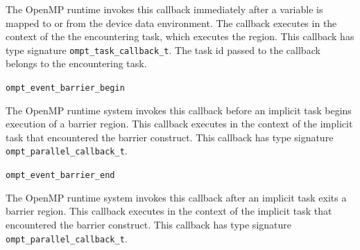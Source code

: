 \documentclass{article}
\newcommand{\descheader}[1]{{\needspace{3\baselineskip}\vspace{1em}\noindent \fbox{#1}}}
\begin{document}
\begin{description}
  The OpenMP runtime invokes this callback immediately after a variable is mapped to or from the device data environment.
  The callback executes in the context of the the encountering task, which executes the region.
  This callback has type signature \verb|ompt_task_callback_t|. The task id passed to the callback belongs to the encountering task.

% 
% 
% 


\end{description}


\descheader{Barriers}

\begin{description}
 
\item \verb|ompt_event_barrier_begin|

 \sloppy
  The OpenMP runtime system invokes this callback before an implicit task
  begins execution of a barrier region. This callback executes in
  the context of the implicit task that encountered the barrier construct.
  This callback has type signature \verb|ompt_parallel_callback_t|. 
 
\item \verb|ompt_event_barrier_end|

  The OpenMP runtime system invokes this callback after an implicit task
  exits a barrier region. This callback executes
  in the context of the implicit task that encountered the barrier construct.
  This callback has type signature \verb|ompt_parallel_callback_t|. 

\end{description}

\descheader{Taskwait}
\end{document}

